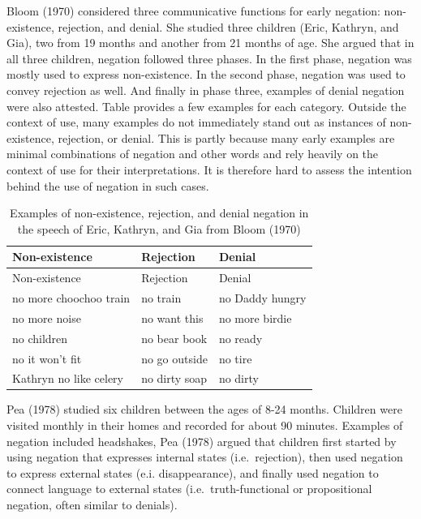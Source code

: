 \documentclass[
  english,
  man,floatsintext]{apa6}
\begin{document}
Bloom (1970) considered three communicative functions for early negation: non-existence, rejection, and denial. She studied three children (Eric, Kathryn, and Gia), two from 19 months and another from 21 months of age. She argued that in all three children, negation followed three phases. In the first phase, negation was mostly used to express non-existence. In the second phase, negation was used to convey rejection as well. And finally in phase three, examples of denial negation were also attested. Table provides a few examples for each category. Outside the context of use, many examples do not immediately stand out as instances of non-existence, rejection, or denial. This is partly because many early examples are minimal combinations of negation and other words and rely heavily on the context of use for their interpretations. It is therefore hard to assess the intention behind the use of negation in such cases.

\begin{longtable}[]{@{}lll@{}}
\caption{\label{tab:bloom} Examples of non-existence, rejection, and denial negation in the speech of Eric, Kathryn, and Gia from Bloom (1970)}\tabularnewline
\toprule
Non-existence & Rejection & Denial \\
\midrule
\endfirsthead
\toprule
Non-existence & Rejection & Denial \\
\midrule
\endhead
no more choochoo train & no train & no Daddy hungry \\
no more noise & no want this & no more birdie \\
no children & no bear book & no ready \\
no it won't fit & no go outside & no tire \\
Kathryn no like celery & no dirty soap & no dirty \\
\bottomrule
\end{longtable}

Pea (1978) studied six children between the ages of 8-24 months. Children were visited monthly in their homes and recorded for about 90 minutes. Examples of negation included headshakes, Pea (1978) argued that children first started by using negation that expresses internal states (i.e.~rejection), then used negation to express external states (e.i. disappearance), and finally used negation to connect language to external states (i.e.~truth-functional or propositional negation, often similar to denials).
\end{document}
